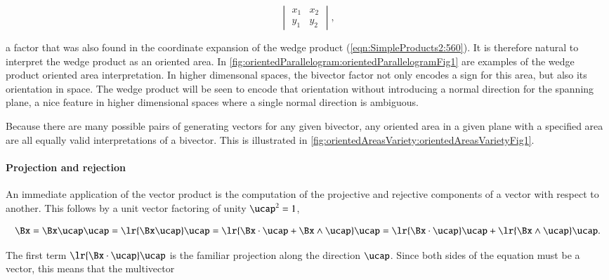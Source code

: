 \begin{dmath}\label{eqn:SimpleProducts2:660}
\begin{vmatrix}
   x_1 & x_2 \\
   y_1 & y_2
\end{vmatrix},
\end{dmath}

a factor that was also found in the coordinate expansion of the wedge product (\cref{eqn:SimpleProducts2:560}).
It is therefore natural to interpret the wedge product as an oriented area.
In \cref{fig:orientedParallelogram:orientedParallelogramFig1} are examples of the wedge product oriented area interpretation.
In higher dimensonal spaces, the bivector factor not only encodes a sign for this area, but also its orientation in space.
The wedge product will be seen to encode that orientation without introducing a normal direction for the spanning plane, a nice feature in higher dimensional spaces where a single normal direction is ambiguous.

Because there are many possible pairs of generating vectors for any given bivector, any oriented area in a given plane with a specified area are all equally valid interpretations of a bivector.
This is illustrated in \cref{fig:orientedAreasVariety:orientedAreasVarietyFig1}.

\paragraph{Projection and rejection}

An immediate application of the vector product is the computation of the projective and rejective components of a vector with respect to another.
This follows by a unit vector factoring of unity \( \ucap^2 = 1 \),

\begin{dmath}\label{eqn:SimpleProducts2:680}
\Bx =
\Bx \ucap \ucap
=
\lr{ \Bx \ucap } \ucap
=
\lr{ \Bx \cdot \ucap + \Bx \wedge \ucap } \ucap
=
\lr{ \Bx \cdot \ucap } \ucap + \lr{ \Bx \wedge \ucap } \ucap.
\end{dmath}

The first term \( \lr{ \Bx \cdot \ucap } \ucap \) is the familiar projection along the direction \( \ucap \).
Since both sides of the equation must be a vector, this means that the multivector

